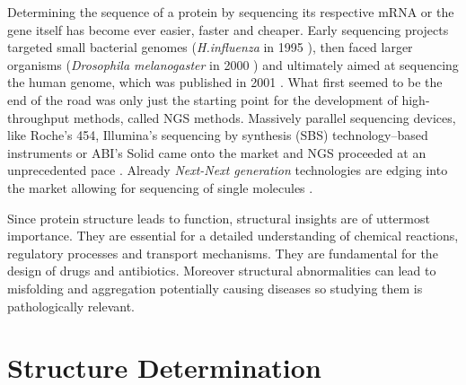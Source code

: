 \documentclass[12pt,a4paper,twoside]{book}
\begin{document}
Determining the sequence of a protein by sequencing its respective mRNA
or the gene itself has become ever easier, faster and cheaper. Early
sequencing projects targeted small bacterial genomes
(\textit{H.influenza} in 1995 \citep{Fleischmann1995}), then faced
larger organisms (\textit{Drosophila melanogaster} in 2000
\citep{Adams2000}) and ultimately aimed at sequencing the human genome,
which was published in 2001 \citep{Venter2001,Lander2001}. What first
seemed to be the end of the road was only just the starting point for
the development of high-throughput methods, called \ac{NGS} methods.
Massively parallel sequencing devices, like Roche's 454, Illumina's
sequencing by synthesis (SBS) technology--based instruments or ABI's
Solid came onto the market and \ac{NGS} proceeded at an unprecedented
pace \citep{Liu2012,Pareek2011}. Already \textit{Next-Next generation}
technologies are edging into the market allowing for sequencing of
single molecules \citep{Ku2013}.

Since protein structure leads to function, structural insights are of
uttermost importance. They are essential for a detailed understanding of
chemical reactions, regulatory processes and transport mechanisms. They
are fundamental for the design of drugs and antibiotics. Moreover
structural abnormalities can lead to misfolding and aggregation
potentially causing diseases so studying them is pathologically
relevant.

\section{Structure Determination}\label{structure-determination}
\end{document}
